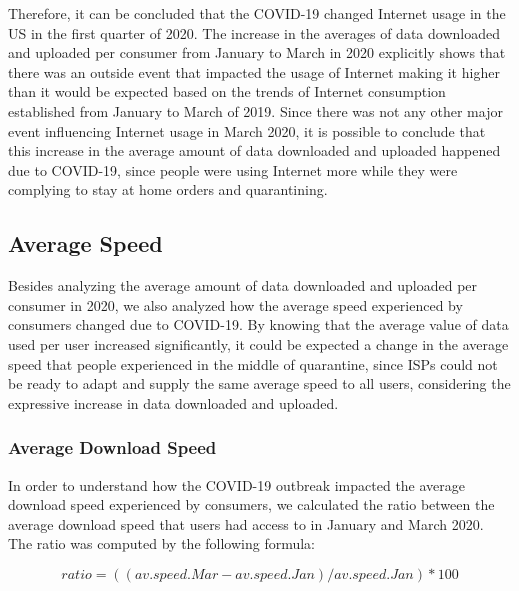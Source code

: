 \documentclass[conference,10pt]{IEEEtran}
\begin{document}
Therefore, it can be concluded that the COVID-19 changed Internet usage in the US in the first quarter of 2020. The increase in the averages of data downloaded and uploaded per consumer from January to March in 2020 explicitly shows that there was an outside event that impacted the usage of Internet making it higher than it would be expected based on the trends of Internet consumption established from January to March of 2019. Since there was not any other major event influencing  Internet usage in March 2020, it is possible to conclude that this increase in the average amount of data downloaded and uploaded happened due to COVID-19, since people were using Internet more while they were complying to stay at home orders and quarantining.

\subsection{Average Speed}
\label{sec:average-speed}
Besides analyzing the average amount of data downloaded and uploaded per consumer in 2020, we also analyzed how the average speed experienced by consumers changed due to COVID-19. By knowing that the average value of data used per user increased significantly, it could be expected a change in the average speed that people experienced in the middle of quarantine, since ISPs could not be ready to adapt and supply the same average speed to all users, considering the expressive increase in data downloaded and uploaded.

\subsubsection{Average Download Speed}
\label{sec:average-download-speed}

In order to understand how the COVID-19 outbreak impacted the average download speed experienced by consumers, we calculated the ratio between the average download speed that users had access to in January and March 2020. The ratio was computed by the following formula:

\begin{equation}
ratio= ((av.speed.Mar - av.speed.Jan)/ av.speed.Jan)*100
\end{equation}
\end{document}
